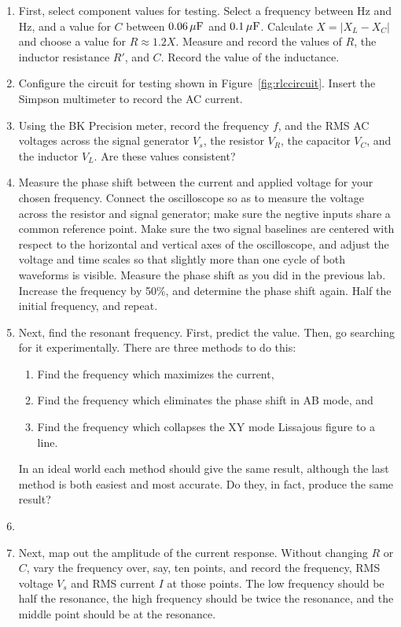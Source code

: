\documentclass[12pt]{article}
\begin{document}
\begin{enumerate}
\item First, select component values for testing.  Select a frequency
  between \unit[300]{Hz} and \unit[600]{Hz}, and a value for $C$
  between $\unit[0.06]{\mu F}$ and $\unit[0.1]{\mu F}$.  Calculate $X
  = \left| X_L-X_C \right|$ and choose a value for $R \approx 1.2 X$.
  Measure and record the values of $R$, the inductor resistance $R'$,
  and $C$.  Record the value of the inductance.
\item Configure the circuit for testing shown in
  Figure~\ref{fig:rlccircuit}.  Insert the Simpson multimeter to
  record the AC current.
\item Using the BK Precision meter, record the frequency $f$, and the
  RMS AC voltages across the signal generator $V_s$, the resistor
  $V_R$, the capacitor $V_C$, and the inductor $V_L$.  Are these
  values consistent?
\item \label{item:phase} Measure the phase shift between the current
  and applied voltage for your chosen frequency.  Connect the
  oscilloscope so as to measure the voltage across the resistor and
  signal generator; make sure the negtive inputs share a common
  reference point.  Make sure the two signal baselines are centered
  with respect to the horizontal and vertical axes of the
  oscilloscope, and adjust the voltage and time scales so that
  slightly more than one cycle of both waveforms is visible.  Measure
  the phase shift as you did in the previous lab.  Increase the
  frequency by 50\%, and determine the phase shift again.  Half the
  initial frequency, and repeat.
\item \label{item:phase_resonance} Next, find the resonant frequency.
  First, predict the value.  Then, go searching for it experimentally.
  There are three methods to do this:
  \begin{enumerate}
  \item Find the frequency which maximizes the current, 
  \item Find the frequency which eliminates the phase shift in AB
    mode, and
  \item Find the frequency which collapses the XY mode Lissajous
    figure to a line.
  \end{enumerate}
  In an ideal world each method should give the same result, although
  the last method is both easiest and most accurate.  Do they, in
  fact, produce the same result?
\item \label{item:amplitude_resonance} 
\item \label{item:current_response} Next, map out the amplitude of the current
  response.  Without changing $R$ or $C$, vary the frequency over, say, ten
  points, and record the frequency, RMS voltage $V_s$ and RMS current
  $I$ at those points.  The low frequency should be half the
  resonance, the high frequency should be twice the resonance, and the
  middle point should be at the resonance.
\end{enumerate}
\end{document}
